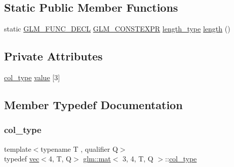 \subsection*{Static Public Member Functions}
\begin{DoxyCompactItemize}
\item 
static \hyperlink{setup_8hpp_ab2d052de21a70539923e9bcbf6e83a51}{G\+L\+M\+\_\+\+F\+U\+N\+C\+\_\+\+D\+E\+CL} \hyperlink{setup_8hpp_a08b807947b47031d3a511f03f89645ad}{G\+L\+M\+\_\+\+C\+O\+N\+S\+T\+E\+X\+PR} \hyperlink{structglm_1_1mat_3_013_00_014_00_01_t_00_01_q_01_4_a6a07c3870b8e6d4ba5f1ec8fa988d9bf}{length\+\_\+type} \hyperlink{structglm_1_1mat_3_013_00_014_00_01_t_00_01_q_01_4_aee79c3b80a64a53f025f031a01280a35}{length} ()
\end{DoxyCompactItemize}
\subsection*{Private Attributes}
\begin{DoxyCompactItemize}
\item 
\hyperlink{structglm_1_1mat_3_013_00_014_00_01_t_00_01_q_01_4_aaa23c4674cbe2dc1eda1d826b8ef721e}{col\+\_\+type} \hyperlink{structglm_1_1mat_3_013_00_014_00_01_t_00_01_q_01_4_a5565dc4ee500797675a5841e79cf8d3c}{value} \mbox{[}3\mbox{]}
\end{DoxyCompactItemize}


\subsection{Member Typedef Documentation}
\mbox{\label{structglm_1_1mat_3_013_00_014_00_01_t_00_01_q_01_4_aaa23c4674cbe2dc1eda1d826b8ef721e}} 
\subsubsection{\texorpdfstring{col\+\_\+type}{col\_type}}
{\footnotesize\ttfamily template$<$typename T , qualifier Q$>$ \\
typedef \hyperlink{structglm_1_1vec}{vec}$<$4, T, Q$>$ \hyperlink{structglm_1_1mat}{glm\+::mat}$<$ 3, 4, T, Q $>$\+::\hyperlink{structglm_1_1mat_3_013_00_014_00_01_t_00_01_q_01_4_aaa23c4674cbe2dc1eda1d826b8ef721e}{col\+\_\+type}}


